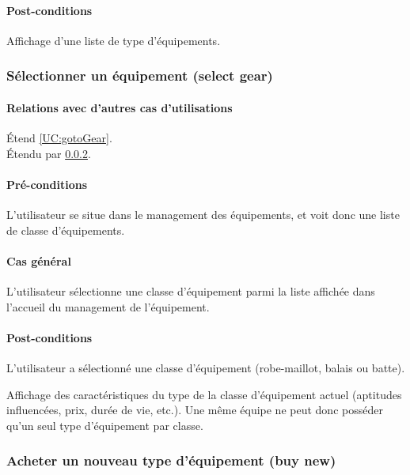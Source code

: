 \paragraph{Post-conditions}
\begin{list}{}{\leftmargin=1.5em}
\item{Affichage d'une liste de type d'équipements.}
\end{list}

 \subsubsection{Sélectionner un équipement (select gear)}
\label{UC:selectGear}
\paragraph{Relations avec d'autres cas d'utilisations}
Étend \ref{UC:gotoGear}.\\
Étendu par \ref{UC:buyGear}.
\paragraph{Pré-conditions}
\begin{list}{}{\leftmargin=1.5em}
\item{L'utilisateur se situe dans le management des équipements, et voit donc une liste de classe d'équipements.}
\end{list}
\paragraph{Cas général}
L'utilisateur sélectionne une classe d'équipement parmi la liste affichée dans l'accueil du management de l'équipement.
\paragraph{Post-conditions}
\begin{list}{}{\leftmargin=1.5em}
\item{L'utilisateur a sélectionné une classe d'équipement (robe-maillot, balais ou batte).}
\item{Affichage des caractéristiques du type de la classe d'équipement actuel (aptitudes influencées, prix, durée de vie, etc.). Une même équipe ne peut donc posséder qu'un seul type d'équipement par classe.}
\end{list}

\subsubsection{Acheter un nouveau type d'équipement (buy new)}
\label{UC:buyGear}
